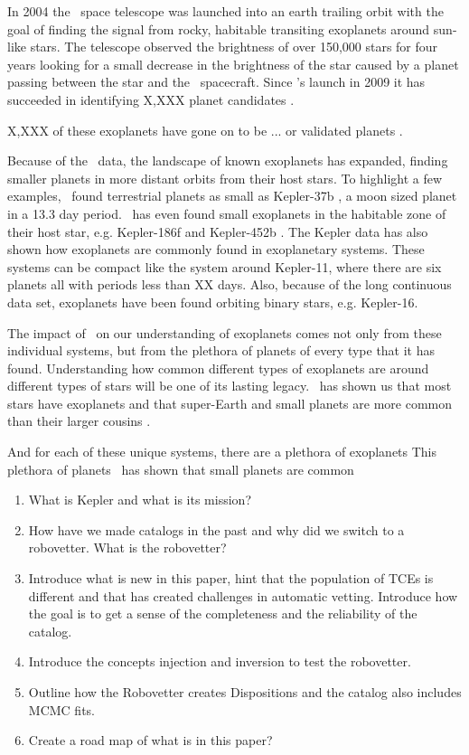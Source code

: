 In 2004 the \Kepler\ space telescope was launched into an earth trailing orbit with the goal of finding the signal from rocky, habitable transiting exoplanets \citep{Koch2010} around sun-like stars. The telescope observed the brightness of over 150,000 stars for four years looking for a small decrease in the brightness of the star caused by a planet passing between the star and the \Kepler\ spacecraft. 
Since \Kepler's launch in 2009 it has succeeded in identifying X,XXX planet candidates \citep{Borucki2010a,Coughlin2016}. 

X,XXX of these exoplanets have gone on to be ... or validated planets \citep[see most recently][]{Morton2016}.  %

Because of the \Kepler\ data, the landscape of known exoplanets has expanded, finding smaller planets in more distant orbits from their host stars.  To highlight a few examples,  \Kepler\ found terrestrial planets as small as Kepler-37b \citep{Barclay2013}, a moon sized planet in a 13.3 day period. \Kepler\ has even found small exoplanets in the habitable zone of their host star, e.g. Kepler-186f \citep{Quintana2014} and Kepler-452b \citep{Jenkins2015}.  The Kepler data has also shown how exoplanets are commonly found in exoplanetary systems. These systems can be compact like the system around Kepler-11, where there are six planets all with periods less than XX days. Also, because of the long continuous data set, exoplanets have been found orbiting binary stars, e.g. Kepler-16\citep{Doyle2011}.


The impact of \Kepler\ on our understanding of exoplanets comes not only from these individual systems, but from the plethora of planets of every type that it has found. Understanding how common different types of exoplanets are around different types of stars will be one of its lasting legacy. \Kepler\ has shown us that most stars have exoplanets and that super-Earth and small planets are more common than their larger cousins \citet{Burke2015}.  


And for each of these unique systems, there are a plethora of exoplanets This plethora of planets \Kepler\ has shown that small planets are common 

\begin{enumerate}
\item What is Kepler and what is its mission?
\item How have we made catalogs in the past and why did we switch to a robovetter. What is the robovetter?
\item Introduce what is new in this paper, hint that the population of TCEs is different and that has created challenges in automatic vetting. Introduce how the goal is to get a sense of the completeness and the reliability of the catalog.
\item Introduce the concepts injection and inversion to test the robovetter.
\item Outline how the Robovetter creates Dispositions and the catalog also includes MCMC fits.
\item Create a road map of what is in this paper?
\end{enumerate}
